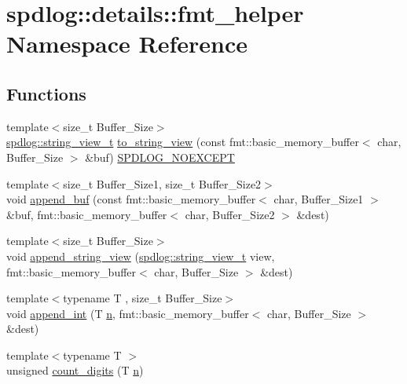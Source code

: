 \hypertarget{namespacespdlog_1_1details_1_1fmt__helper}{}\section{spdlog\+:\+:details\+:\+:fmt\+\_\+helper Namespace Reference}
\label{namespacespdlog_1_1details_1_1fmt__helper}
\subsection*{Functions}
\begin{DoxyCompactItemize}
\item 
{\footnotesize template$<$size\+\_\+t Buffer\+\_\+\+Size$>$ }\\\hyperlink{namespacespdlog_af48e310b2f366ac6544701e6a3b56247}{spdlog\+::string\+\_\+view\+\_\+t} \hyperlink{namespacespdlog_1_1details_1_1fmt__helper_aa2b4191cb8c40474fb61787ad67face5}{to\+\_\+string\+\_\+view} (const fmt\+::basic\+\_\+memory\+\_\+buffer$<$ char, Buffer\+\_\+\+Size $>$ \&buf) \hyperlink{common_8h_a15d2dc432e6bb83beb5130be9a4ca8d6}{S\+P\+D\+L\+O\+G\+\_\+\+N\+O\+E\+X\+C\+E\+PT}
\item 
{\footnotesize template$<$size\+\_\+t Buffer\+\_\+\+Size1, size\+\_\+t Buffer\+\_\+\+Size2$>$ }\\void \hyperlink{namespacespdlog_1_1details_1_1fmt__helper_a1cd64e7ba833d726c77344aa9fb85e6a}{append\+\_\+buf} (const fmt\+::basic\+\_\+memory\+\_\+buffer$<$ char, Buffer\+\_\+\+Size1 $>$ \&buf, fmt\+::basic\+\_\+memory\+\_\+buffer$<$ char, Buffer\+\_\+\+Size2 $>$ \&dest)
\item 
{\footnotesize template$<$size\+\_\+t Buffer\+\_\+\+Size$>$ }\\void \hyperlink{namespacespdlog_1_1details_1_1fmt__helper_a603f4d0d8853a61610a0042d5d62fe94}{append\+\_\+string\+\_\+view} (\hyperlink{namespacespdlog_af48e310b2f366ac6544701e6a3b56247}{spdlog\+::string\+\_\+view\+\_\+t} view, fmt\+::basic\+\_\+memory\+\_\+buffer$<$ char, Buffer\+\_\+\+Size $>$ \&dest)
\item 
{\footnotesize template$<$typename T , size\+\_\+t Buffer\+\_\+\+Size$>$ }\\void \hyperlink{namespacespdlog_1_1details_1_1fmt__helper_a0d2621043fa718e54ffcaa2e9812dfa4}{append\+\_\+int} (T \hyperlink{format_8h_a9ab7e5832cef391eb8b1505a601fb215}{n}, fmt\+::basic\+\_\+memory\+\_\+buffer$<$ char, Buffer\+\_\+\+Size $>$ \&dest)
\item 
{\footnotesize template$<$typename T $>$ }\\unsigned \hyperlink{namespacespdlog_1_1details_1_1fmt__helper_a976eeb3c4a42ccfb05437aa9a0d4d9f7}{count\+\_\+digits} (T \hyperlink{format_8h_a9ab7e5832cef391eb8b1505a601fb215}{n})

\end{DoxyCompactItemize}

